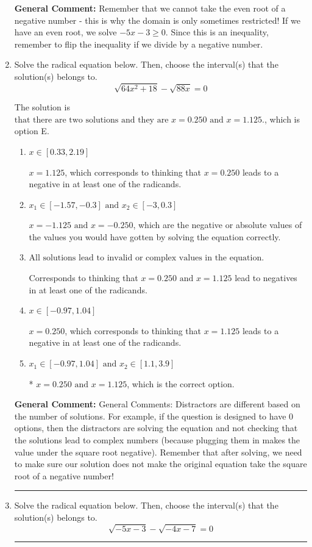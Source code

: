\documentclass{extbook}[14pt]
\newcommand{\litem}[1]{\item #1

\rule{\textwidth}{0.4pt}}
\begin{document}
\begin{enumerate}
{\textbf{General Comment:} Remember that we cannot take the even root of a negative number - this is why the domain is only sometimes restricted! If we have an even root, we solve $-5 x - 3 \geq 0$. Since this is an inequality, remember to flip the inequality if we divide by a negative number.
}
\litem{
Solve the radical equation below. Then, choose the interval(s) that the solution(s) belongs to.
\[ \sqrt{64 x^2 + 18} - \sqrt{88 x} = 0 \]

The solution is \( \text{that there are two solutions and they are } x = 0.250 \text{ and } x = 1.125. \), which is option E.\begin{enumerate}[label=\Alph*.]
\item \( x \in [0.33,2.19] \)

$x = 1.125$, which corresponds to thinking that $x = 0.250$ leads to a negative in at least one of the radicands.
\item \( x_1 \in [-1.57, -0.3] \text{ and } x_2 \in [-3,0.3] \)

$x = -1.125 \text{ and } x = -0.250$, which are the negative or absolute values of the values you would have gotten by solving the equation correctly.
\item \( \text{All solutions lead to invalid or complex values in the equation.} \)

Corresponds to thinking that $x = 0.250 \text{ and } x = 1.125$ lead to negatives in at least one of the radicands.
\item \( x \in [-0.97,1.04] \)

$x = 0.250$, which corresponds to thinking that $x = 1.125$ leads to a negative in at least one of the radicands.
\item \( x_1 \in [-0.97, 1.04] \text{ and } x_2 \in [1.1,3.9] \)

* $x = 0.250 \text{ and } x = 1.125$, which is the correct option.
\end{enumerate}

\textbf{General Comment:} General Comments: Distractors are different based on the number of solutions. For example, if the question is designed to have 0 options, then the distractors are solving the equation and not checking that the solutions lead to complex numbers (because plugging them in makes the value under the square root negative). Remember that after solving, we need to make sure our solution does not make the original equation take the square root of a negative number!
}
\litem{
Solve the radical equation below. Then, choose the interval(s) that the solution(s) belongs to.
\[ \sqrt{-5 x - 3} - \sqrt{-4 x - 7} = 0 \]

}
\end{enumerate}
\end{document}
